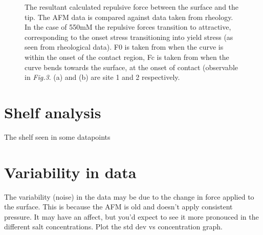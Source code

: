 \begin{figure}[!tbph!!!]
  \centering
  \hfill
  \caption{The resultant calculated repulsive force between the surface and the tip. The AFM data is compared against data taken from rheology. In the case of 550mM the repulsive forces transition to attractive, corresponding to the onset stress transitioning into yield stress (as seen from rheological data). F0 is taken from when the curve is within the onset of the contact region, Fc is taken from when the curve bends towards the surface, at the onset of contact (observable in \textit{Fig.3}. (a) and (b) are site 1 and 2 respectively\cite{John}.}
\end{figure}

\section{Shelf analysis}

The shelf seen in some datapoints 

\section{Variability in data}

The variability (noise) in the data may be due to the change in force applied to the surface. This is because the AFM is old and doesn't apply consistent pressure. It may have an affect, but you'd expect to see it more pronouced in the different salt concentrations. Plot the std dev vs concentration graph.

